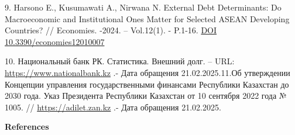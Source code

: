 \begin{references}
9. Harsono E., Kusumawati A., Nirwana N. External Debt Determinants: Do
Macroeconomic and Institut\-ional Ones Matter for Selected ASEAN
Developing Countries? // Economies. -2024. -- Vol.12(1). - P.1-16.
\href{https://doi.org/10.3390/economies12010007}{DOI
10.3390/economies12010007}

10. Национальный банк РК. Статистика. Внешний долг. -- URL:
\href{https://www.nationalbank.kz/ru/news/vneshniy-dolg}{https://www.nationalbank.kz}
.- Дата обращения 21.02.2025.11.Об утверждении Концепции управления
государственными финансами Республики Казахстан до 2030 года. Указ
Президента Республики Казахстан от 10 сентября 2022 года № 1005. //
\href{https://adilet.zan.kz/rus/docs/U2200001005}{https://adilet.zan.kz} .- Дата обращения
21.02.2025. 
\end{references}

\begin{center}
{\bfseries References}
\end{center}

